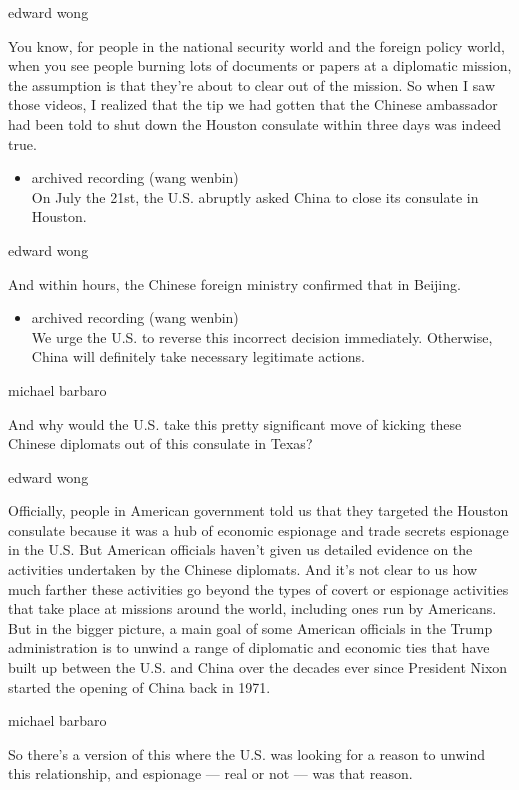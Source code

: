 edward wong

You know, for people in the national security world and the foreign
policy world, when you see people burning lots of documents or papers at
a diplomatic mission, the assumption is that they're about to clear out
of the mission. So when I saw those videos, I realized that the tip we
had gotten that the Chinese ambassador had been told to shut down the
Houston consulate within three days was indeed true.

\begin{itemize}
\tightlist
\item
  archived recording (wang wenbin)\\
  On July the 21st, the U.S. abruptly asked China to close its consulate
  in Houston.
\end{itemize}

edward wong

And within hours, the Chinese foreign ministry confirmed that in
Beijing.

\begin{itemize}
\tightlist
\item
  archived recording (wang wenbin)\\
  We urge the U.S. to reverse this incorrect decision immediately.
  Otherwise, China will definitely take necessary legitimate actions.
\end{itemize}

michael barbaro

And why would the U.S. take this pretty significant move of kicking
these Chinese diplomats out of this consulate in Texas?

edward wong

Officially, people in American government told us that they targeted the
Houston consulate because it was a hub of economic espionage and trade
secrets espionage in the U.S. But American officials haven't given us
detailed evidence on the activities undertaken by the Chinese diplomats.
And it's not clear to us how much farther these activities go beyond the
types of covert or espionage activities that take place at missions
around the world, including ones run by Americans. But in the bigger
picture, a main goal of some American officials in the Trump
administration is to unwind a range of diplomatic and economic ties that
have built up between the U.S. and China over the decades ever since
President Nixon started the opening of China back in 1971.

michael barbaro

So there's a version of this where the U.S. was looking for a reason to
unwind this relationship, and espionage --- real or not --- was that
reason.

